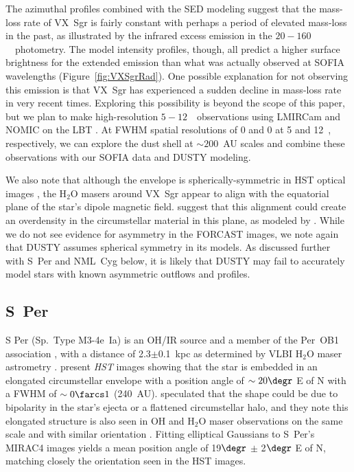 \documentclass[modern]{aastex61}
\begin{document}
The azimuthal profiles combined with the SED modeling suggest that the mass-loss rate of VX~Sgr is fairly constant with perhaps a period of elevated mass-loss in the past, as illustrated by the infrared excess emission in the $20-160$~\micron\ photometry. The model intensity profiles, though, all predict a higher surface brightness for the extended emission than what was actually observed at SOFIA wavelengths (Figure~\ref{fig:VXSgrRad}). One possible explanation for not observing this emission is that VX~Sgr has experienced a sudden decline in mass-loss rate in very recent times. Exploring this possibility is beyond the scope of this paper, but we plan to make high-resolution $5-12$~\micron\ observations using LMIRCam and NOMIC on the LBT \citep{skrutskie2010,hoffmann2014}. At FWHM spatial resolutions of 0 and 0 at 5 and 12~\micron, respectively, we can explore the dust shell at $\sim200$~AU scales and combine these observations with our SOFIA data and DUSTY modeling.

We also note that although the envelope is spherically-symmetric in HST optical images \citep{schuster2006}, the H$_{2}$O masers around VX~Sgr appear to align with the equatorial plane of the star's dipole magnetic field. \cite{vlemmings2005} suggest that this alignment could create an overdensity in the circumstellar material in this plane, as modeled by \cite{matt2000}.  While we do not see evidence for asymmetry in the FORCAST images, we note again that DUSTY assumes spherical symmetry in its models.  As discussed further with S~Per and NML~Cyg below, it is likely that DUSTY may fail to accurately model stars with known asymmetric outflows and profiles.





\subsection{S~Per}\label{sec:sper}
S Per (Sp.\ Type M3-4e~Ia) is an OH/IR source and a member of the Per~OB1 association \citep{humphreys1978}, with a distance of 2.3$\pm$0.1~kpc as determined by VLBI H$_{2}$O maser astrometry \citep{asaki2010}.  \citet{schuster2006} present \emph{HST} images showing that the star is embedded in an elongated circumstellar envelope with a position angle of $\sim20\degr$ E of N with a FWHM of $\sim0\farcs1$ (240~AU).  \cite{schuster2006} speculated that the shape could be due to bipolarity in the star's ejecta or a flattened circumstellar halo, and they note this elongated structure is also seen in OH and H$_{2}$O maser observations on the same scale and with similar orientation \citep{richards1999,vlemmings2001}. Fitting elliptical Gaussians to S~Per's MIRAC4 images yields a mean position angle of 19$\degr$ $\pm$ 2$\degr$ E of N, matching closely the orientation seen in the HST images.
\end{document}
